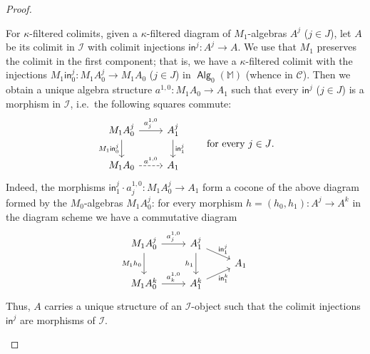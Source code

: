 \documentclass[sigconf,
			final%
			nonacm
                        ]{acmart}
\numberwithin{equation}{section}
\numberwithin{equation}{section}
\theoremstyle{plain}
\theoremstyle{definition}
\newcommand{\inj}{\mathsf{in}}
\newcommand{\M}{\mathbb{M}}                   %
\newcommand{\CatC}{\mathscr{C}}           %
\newcommand{\CatI}{\mathscr{I}}
\DeclareMathOperator{\Alg}{\mathsf{Alg}}
\begin{document}
\begin{proof}
\begin{enumerate}
    For $\kappa$-filtered colimits, given a $\kappa$-filtered diagram
    of $M_1$-algebras $A^j$ ($j\in J$), let $A$ be its colimit in
    $\CatI$ with colimit injections $\inj^j\colon A^j \to A$. We use
    that $M_1$ preserves the colimit in the first component; that is,
    we have a $\kappa$-filtered colimit with the injections
    $M_1\inj^j_0\colon M_1A^j_0 \to M_1A_0$ ($j\in J$) in $\Alg_0(\M)$ (whence in
    $\CatC$). Then we obtain a unique algebra structure
    $a^{1,0}\colon M_1A_0 \to A_1$ such that every $\inj^j$
    ($j \in J$) is a morphism in $\CatI$, i.e.~the following squares
    commute:
    \[
      \begin{tikzcd}
        M_1A^j_0
        \ar{r}{a^{1,0}_j}
        \ar{d}[swap]{M_1\inj^j_0}
        &
        A^j_1
        \ar{d}{\inj^j_1}
        \\
        M_1A_0
        \ar[dashed]{r}{a^{1,0}}
        &
        A_1
      \end{tikzcd}
      \qquad
      \text{for every $j \in J$}.
    \]
    Indeed, the morphisms $\inj^j_1 \cdot a^{1,0}_j\colon M_1A^j_0 \to
    A_1$ form a cocone of the above diagram formed by the
    $M_0$-algebras $M_1A^j_0$: for every morphism $h = (h_0,h_1)\colon
    A^j \to A^k$ in the diagram scheme we have a commutative diagram
    \[
      \begin{tikzcd}[row sep = 3]
        M_1A^j_0
        \ar{r}{a^{1,0}_j}
        \ar{dd}[swap]{M_1h_0}
        &
        A^j_1
        \ar{rd}[inner sep = 0]{\inj^j_1}
        \ar{dd}[swap]{h_1}
        \\
        &&
        A_1
        \\
        M_1A^k_0
        \ar{r}{a^{1,0}_k}
        &
        A^k_1
        \ar{ru}[swap, inner sep =0]{\inj^k_1}
      \end{tikzcd}
    \]
    Thus, $A$ carries a unique structure of an $\CatI$-object such
    that the colimit injections $\inj^j$ are morphisms of $\CatI$.


\end{enumerate}
\end{proof}
\end{document}
